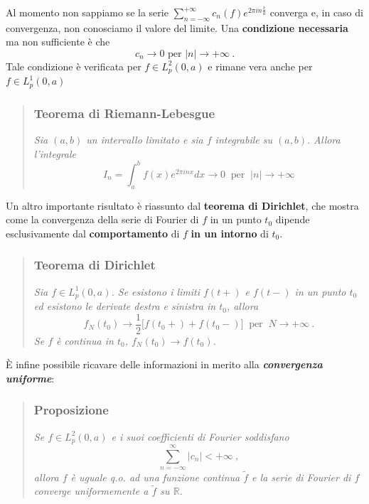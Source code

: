\documentclass[
]{book}
\begin{document}
Al momento non sappiamo se la serie \(\sum_{n=-\infty}^{+\infty}c_n(f)e^{2\pi in\frac{t}{a}}\) converga e, in caso di convergenza, non conosciamo il valore del limite.
Una \textbf{condizione necessaria} ma non sufficiente è che \[c_n \rightarrow 0 \text{ per } |n| \rightarrow + \infty \ .\]
Tale condizione è verificata per \(f \in L_p^2(0,a)\) e rimane vera anche per \(f \in L_p^1(0,a)\)

\begin{quote}
\hypertarget{teorema-di-riemann-lebesgue}{%
\subsubsection*{Teorema di Riemann-Lebesgue}\label{teorema-di-riemann-lebesgue}}

\emph{Sia \((a,b)\) un intervallo limitato e sia \(f\) integrabile su \((a,b)\).}
\emph{Allora l'integrale}
\[ I_n = \int_{a}^{b}f(x)e^{2 \pi in x} dx \rightarrow 0 \ \text{ per } \ |n| \rightarrow + \infty \]
\end{quote}

Un altro importante risultato è riassunto dal \textbf{teorema di Dirichlet}, che mostra come la convergenza della serie di Fourier di \(f\) in un punto \(t_0\) dipende esclusivamente dal \textbf{comportamento} di \(f\) \textbf{in un intorno} di \(t_0\).

\begin{quote}
\hypertarget{teorema-di-dirichlet}{%
\subsubsection*{Teorema di Dirichlet}\label{teorema-di-dirichlet}}

\emph{Sia \(f \in L^1_p(0,a)\). Se esistono i limiti \(f(t+)\) e \(f(t-)\) in un punto \(t_0\) ed esistono le derivate destra e sinistra in \(t_0\), allora}
\[f_N(t_0) \rightarrow \frac{1}{2} \big[ f(t_0+) + f(t_0-) \big] \ \text{ per } \ N \rightarrow +\infty \ .\]
\emph{Se \(f\) è continua in \(t_0\), \(f_N(t_0) \rightarrow f(t_0)\).}
\end{quote}

È infine possibile ricavare delle informazioni in merito alla \emph{\textbf{convergenza uniforme}}:

\begin{quote}
\hypertarget{proposizione}{%
\subsubsection*{Proposizione}\label{proposizione}}

\emph{Se \(f \in L^2_p(0,a)\) e i suoi coefficienti di Fourier soddisfano}
\[ \sum_{n=-\infty}^{\infty} |c_n| < + \infty \ ,\]
\emph{allora \(f\) è uguale q.o. ad una funzione continua \(\tilde f\) e la serie di Fourier di \(f\) converge uniformemente a \(\tilde f\) su \(\mathbb{R}\).}
\end{quote}
\end{document}
